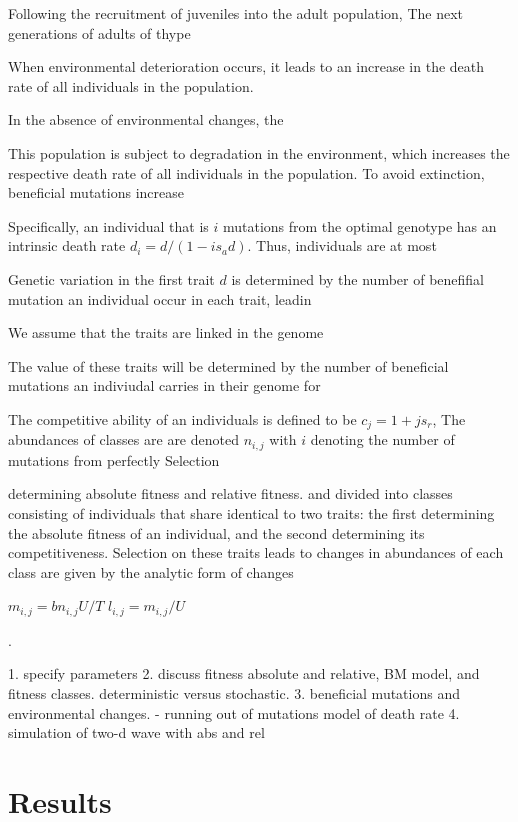 \documentclass[9pt,twocolumn,twoside]{article}
\begin{document}
Following the recruitment of juveniles into the adult population, The next generations of adults of thype 




When environmental deterioration occurs, it leads to an increase in the death rate of all individuals in the population.

In the absence of environmental changes, the 


This population is subject to degradation in the environment, which increases the respective death rate of all individuals in the population. To avoid extinction, beneficial mutations increase 



Specifically, an individual that is $i$ mutations from the optimal genotype has an intrinsic death rate $d_i = d/(1-is_a d)$. Thus, individuals are at most 

Genetic variation in the first trait $d$ is determined by the number of benefifial mutation an individual occur in each trait, leadin 

We assume that the traits are linked in the genome


The value of these traits will be determined by the number of beneficial mutations an indiviudal carries in their genome for 





The competitive ability of an individuals is defined to be $c_j=1+j s_r$, 
The abundances of classes are are denoted $n_{i,j}$ with $i$ denoting the number of mutations from perfectly Selection



determining absolute fitness and relative fitness. and divided into classes consisting of individuals that share identical to two traits: the first determining the absolute fitness of an individual, and the second determining its competitiveness. Selection on these traits leads to changes in abundances of each class are given by the analytic form of changes 

$m_{i,j} = b n_{i,j} U/T$
$l_{i,j} = m_{i,j}/U$


\citet{bertram2019density}.

1. specify parameters
2. discuss fitness absolute and relative, BM model, and fitness classes. deterministic versus stochastic.
3. beneficial mutations and environmental changes. 
- running out of mutations model of death rate
4. simulation of two-d wave with abs and rel

\section{Results}
\end{document}

